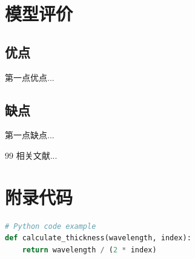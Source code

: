 \documentclass[UTF8, a4paper, 12pt]{ctexart}
\begin{document}
\section{模型评价}
\subsection{优点}
第一点优点...
\subsection{缺点}
第一点缺点...

\begin{thebibliography}{99}
     相关文献...
\end{thebibliography}

\newpage
\appendix
\section{附录代码}
\begin{lstlisting}[language=Python]
# Python code example
def calculate_thickness(wavelength, index):
    return wavelength / (2 * index)
\end{lstlisting}
\end{document}
